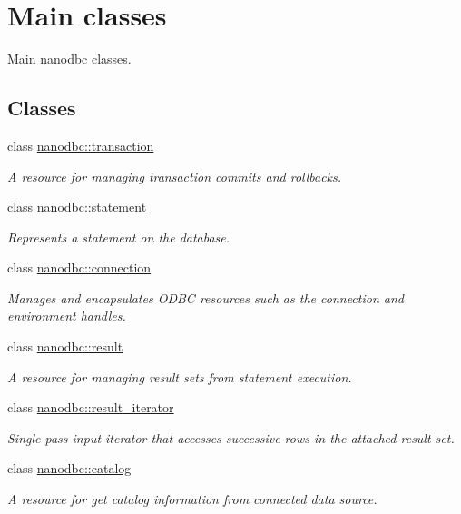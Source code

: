 \hypertarget{group__mainc}{}\section{Main classes}
\label{group__mainc}


Main nanodbc classes.  


\subsection*{Classes}
\begin{DoxyCompactItemize}
\item 
class \mbox{\hyperlink{classnanodbc_1_1transaction}{nanodbc\+::transaction}}
\begin{DoxyCompactList}\small\item\em A resource for managing transaction commits and rollbacks. \end{DoxyCompactList}\item 
class \mbox{\hyperlink{classnanodbc_1_1statement}{nanodbc\+::statement}}
\begin{DoxyCompactList}\small\item\em Represents a statement on the database. \end{DoxyCompactList}\item 
class \mbox{\hyperlink{classnanodbc_1_1connection}{nanodbc\+::connection}}
\begin{DoxyCompactList}\small\item\em Manages and encapsulates O\+D\+BC resources such as the connection and environment handles. \end{DoxyCompactList}\item 
class \mbox{\hyperlink{classnanodbc_1_1result}{nanodbc\+::result}}
\begin{DoxyCompactList}\small\item\em A resource for managing result sets from statement execution. \end{DoxyCompactList}\item 
class \mbox{\hyperlink{classnanodbc_1_1result__iterator}{nanodbc\+::result\+\_\+iterator}}
\begin{DoxyCompactList}\small\item\em Single pass input iterator that accesses successive rows in the attached result set. \end{DoxyCompactList}\item 
class \mbox{\hyperlink{classnanodbc_1_1catalog}{nanodbc\+::catalog}}
\begin{DoxyCompactList}\small\item\em A resource for get catalog information from connected data source. \end{DoxyCompactList}\end{DoxyCompactItemize}

